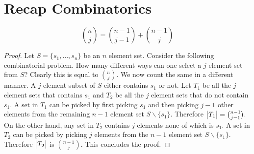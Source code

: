 \section{Recap Combinatorics}
\begin{lemma}
\label{lem:comb}
\[
{n \choose j} = {n-1 \choose j-1} + {n-1 \choose j}
\]
\end{lemma}
\begin{proof}
Let $S = \{s_1,\dots,s_n\}$ be an $n$ element set. Consider the following combinatorial problem. How many different ways can one select a $j$ element set from $S$? Clearly this is equal to ${n \choose j}$. We now count the same in a different manner. A $j$ element subset of $S$ either contains $s_1$ or not. Let $T_1$ be all the $j$ element sets that contains $s_1$ and $T_2$ be all the $j$ element sets that do not contain $s_1$. A set in $T_1$ can be picked by first picking $s_1$ and then picking $j-1$ other elements from the remaining $n-1$ element set $S \backslash \{s_1\}$. Therefore $\big| T_1 \big|={n-1 \choose j-1}$. On the other hand, any set in $T_2$ contains $j$ elements none of which is $s_1$. A set in $T_2$ can be picked by picking $j$ elements from the $n-1$ element set $S \backslash \{s_1\}$. Therefore $\big| T_2 \big|$ is ${n-1 \choose j}$. This concludes the proof.
\end{proof}